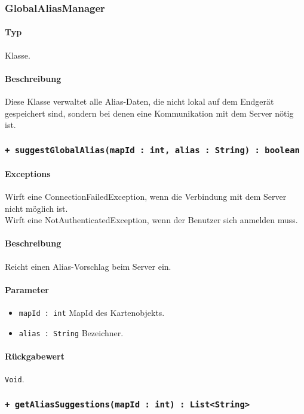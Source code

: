 \subsubsection{GlobalAliasManager}\label{App_AddAlias_GlobalAliasManager}
\paragraph*{Typ}
Klasse.
\paragraph*{Beschreibung}
Diese Klasse verwaltet alle Alias-Daten, die nicht lokal auf dem Endgerät gespeichert sind, 
sondern bei denen eine Kommunikation mit dem Server nötig ist.

\subsubsection*{\texttt{+ suggestGlobalAlias(mapId : int, alias : String) : boolean}}\label{App_AddAlias_GlobalAliasManager_suggestGlobalAlias}%
\paragraph*{Exceptions}
Wirft eine ConnectionFailedException, wenn die Verbindung mit dem Server nicht möglich ist.\\
Wirft eine NotAuthenticatedException, wenn der Benutzer sich anmelden muss.
\paragraph*{Beschreibung}
Reicht einen Alias-Vorschlag beim Server ein.
\paragraph*{Parameter}
\begin{itemize}
    \item \texttt{mapId : int} MapId des Kartenobjekts.
    \item \texttt{alias : String} Bezeichner.
\end{itemize}
\paragraph*{Rückgabewert}
\texttt{Void}.

\subsubsection*{\texttt{+ getAliasSuggestions(mapId : int) : List<String>}}\label{App_AddAlias_GlobalAliasManager_getAliasSuggestions}%

